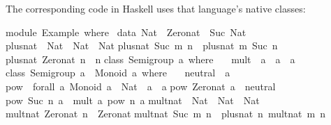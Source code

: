 \begin{isabellebody}
\endisatagquote
{\isafoldquote}%
%
\isadelimquote
%
\endisadelimquote
%
\begin{isamarkuptext}%
\noindent The corresponding code in Haskell uses that language's
  native classes:%
\end{isamarkuptext}%
\isamarkuptrue%
%
\isadelimquotetypewriter
%
\endisadelimquotetypewriter
%
\isatagquotetypewriter
%
\begin{isamarkuptext}%
module\ Example\ where\ {\isacharbraceleft}\isanewline
\isanewline
data\ Nat\ {\isacharequal}\ Zero{\isacharunderscore}nat\ {\isacharbar}\ Suc\ Nat{\isacharsemicolon}\isanewline
\isanewline
plus{\isacharunderscore}nat\ {\isacharcolon}{\isacharcolon}\ Nat\ {\isacharminus}{\isachargreater}\ Nat\ {\isacharminus}{\isachargreater}\ Nat{\isacharsemicolon}\isanewline
plus{\isacharunderscore}nat\ {\isacharparenleft}Suc\ m{\isacharparenright}\ n\ {\isacharequal}\ plus{\isacharunderscore}nat\ m\ {\isacharparenleft}Suc\ n{\isacharparenright}{\isacharsemicolon}\isanewline
plus{\isacharunderscore}nat\ Zero{\isacharunderscore}nat\ n\ {\isacharequal}\ n{\isacharsemicolon}\isanewline
\isanewline
class\ Semigroup\ a\ where\ {\isacharbraceleft}\isanewline
\ \ mult\ {\isacharcolon}{\isacharcolon}\ a\ {\isacharminus}{\isachargreater}\ a\ {\isacharminus}{\isachargreater}\ a{\isacharsemicolon}\isanewline
{\isacharbraceright}{\isacharsemicolon}\isanewline
\isanewline
class\ {\isacharparenleft}Semigroup\ a{\isacharparenright}\ {\isacharequal}{\isachargreater}\ Monoid\ a\ where\ {\isacharbraceleft}\isanewline
\ \ neutral\ {\isacharcolon}{\isacharcolon}\ a{\isacharsemicolon}\isanewline
{\isacharbraceright}{\isacharsemicolon}\isanewline
\isanewline
pow\ {\isacharcolon}{\isacharcolon}\ forall\ a{\isachardot}\ {\isacharparenleft}Monoid\ a{\isacharparenright}\ {\isacharequal}{\isachargreater}\ Nat\ {\isacharminus}{\isachargreater}\ a\ {\isacharminus}{\isachargreater}\ a{\isacharsemicolon}\isanewline
pow\ Zero{\isacharunderscore}nat\ a\ {\isacharequal}\ neutral{\isacharsemicolon}\isanewline
pow\ {\isacharparenleft}Suc\ n{\isacharparenright}\ a\ {\isacharequal}\ mult\ a\ {\isacharparenleft}pow\ n\ a{\isacharparenright}{\isacharsemicolon}\isanewline
\isanewline
mult{\isacharunderscore}nat\ {\isacharcolon}{\isacharcolon}\ Nat\ {\isacharminus}{\isachargreater}\ Nat\ {\isacharminus}{\isachargreater}\ Nat{\isacharsemicolon}\isanewline
mult{\isacharunderscore}nat\ Zero{\isacharunderscore}nat\ n\ {\isacharequal}\ Zero{\isacharunderscore}nat{\isacharsemicolon}\isanewline
mult{\isacharunderscore}nat\ {\isacharparenleft}Suc\ m{\isacharparenright}\ n\ {\isacharequal}\ plus{\isacharunderscore}nat\ n\ {\isacharparenleft}mult{\isacharunderscore}nat\ m\ n{\isacharparenright}{\isacharsemicolon}\isanewline

\end{isamarkuptext}
\end{isabellebody}
